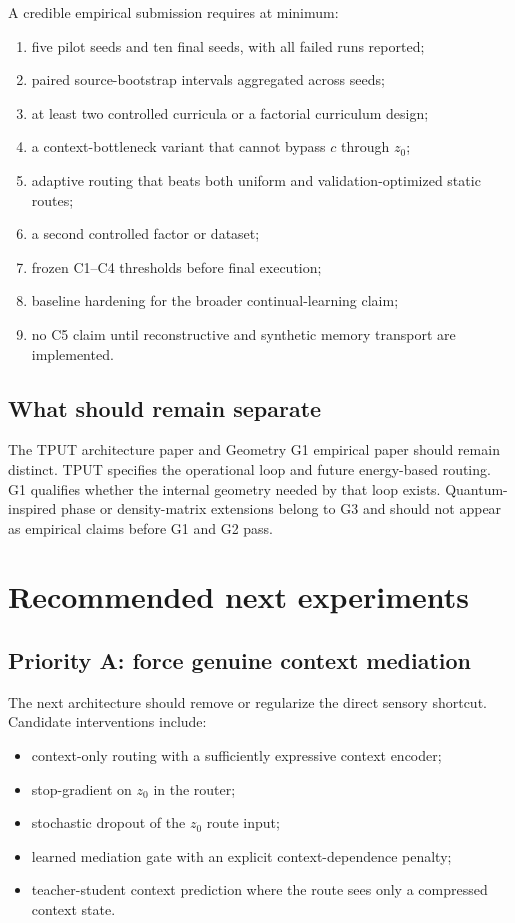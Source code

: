 \documentclass[11pt,a4paper]{article}
\begin{document}
A credible empirical submission requires at minimum:

\begin{enumerate}
\item five pilot seeds and ten final seeds, with all failed runs reported;
\item paired source-bootstrap intervals aggregated across seeds;
\item at least two controlled curricula or a factorial curriculum design;
\item a context-bottleneck variant that cannot bypass $c$ through $z_0$;
\item adaptive routing that beats both uniform and validation-optimized static routes;
\item a second controlled factor or dataset;
\item frozen C1--C4 thresholds before final execution;
\item baseline hardening for the broader continual-learning claim;
\item no C5 claim until reconstructive and synthetic memory transport are implemented.
\end{enumerate}

\subsection{What should remain separate}

The TPUT architecture paper and Geometry G1 empirical paper should remain distinct. TPUT specifies the operational loop and future energy-based routing. G1 qualifies whether the internal geometry needed by that loop exists. Quantum-inspired phase or density-matrix extensions belong to G3 and should not appear as empirical claims before G1 and G2 pass.

\section{Recommended next experiments}

\subsection{Priority A: force genuine context mediation}

The next architecture should remove or regularize the direct sensory shortcut. Candidate interventions include:

\begin{itemize}
\item context-only routing with a sufficiently expressive context encoder;
\item stop-gradient on $z_0$ in the router;
\item stochastic dropout of the $z_0$ route input;
\item learned mediation gate with an explicit context-dependence penalty;
\item teacher-student context prediction where the route sees only a compressed context state.
\end{itemize}
\end{document}
